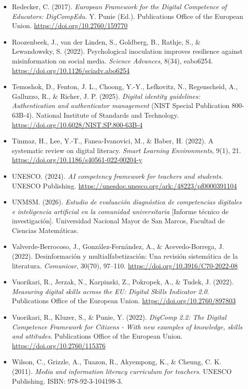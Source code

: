 \begin{itemize}[leftmargin=1.5em, label={}, itemsep=0.22ex, parsep=0pt]
    \item Redecker, C. (2017). \textit{European Framework for the Digital Competence of Educators: DigCompEdu}. Y. Punie (Ed.). Publications Office of the European Union. \url{https://doi.org/10.2760/159770}
    \item Roozenbeek, J., van der Linden, S., Goldberg, B., Rathje, S., \& Lewandowsky, S. (2022). Psychological inoculation improves resilience against misinformation on social media. \textit{Science Advances}, 8(34), eabo6254. \url{https://doi.org/10.1126/sciadv.abo6254}
    \item Temoshok, D., Fenton, J. L., Choong, Y.-Y., Lefkovitz, N., Regenscheid, A., Galluzzo, R., \& Richer, J. P. (2025). \textit{Digital identity guidelines: Authentication and authenticator management} (NIST Special Publication 800-63B-4). National Institute of Standards and Technology. \url{https://doi.org/10.6028/NIST.SP.800-63B-4}
    \item Tinmaz, H., Lee, Y.-T., Fanea-Ivanovici, M., \& Baber, H. (2022). A systematic review on digital literacy. \textit{Smart Learning Environments}, 9(1), 21. \url{https://doi.org/10.1186/s40561-022-00204-y}
    \item UNESCO. (2024). \textit{AI competency framework for teachers and students}. UNESCO Publishing. \url{https://unesdoc.unesco.org/ark:/48223/pf0000391104}
    \item UNMSM. (2026). \textit{Estudio de evaluación diagnóstica de competencias digitales e inteligencia artificial en la comunidad universitaria} [Informe técnico de investigación]. Universidad Nacional Mayor de San Marcos, Facultad de Ciencias Matemáticas.
    \item Valverde-Berrocoso, J., González-Fernández, A., \& Acevedo-Borrega, J. (2022). Desinformación y multialfabetización: Una revisión sistemática de la literatura. \textit{Comunicar}, 30(70), 97--110. \url{https://doi.org/10.3916/C70-2022-08}
    \item Vuorikari, R., Jerzak, N., Karpinski, Z., Pokropek, A., \& Tudek, J. (2022). \textit{Measuring digital skills across the EU: Digital Skills Indicator 2.0}. Publications Office of the European Union. \url{https://doi.org/10.2760/897803}
    \item Vuorikari, R., Kluzer, S., \& Punie, Y. (2022). \textit{DigComp 2.2: The Digital Competence Framework for Citizens - With new examples of knowledge, skills and attitudes}. Publications Office of the European Union. \url{https://doi.org/10.2760/115376}
    \item Wilson, C., Grizzle, A., Tuazon, R., Akyempong, K., \& Cheung, C. K. (2011). \textit{Media and information literacy curriculum for teachers}. UNESCO Publishing. ISBN: 978-92-3-104198-3.
\end{itemize}
